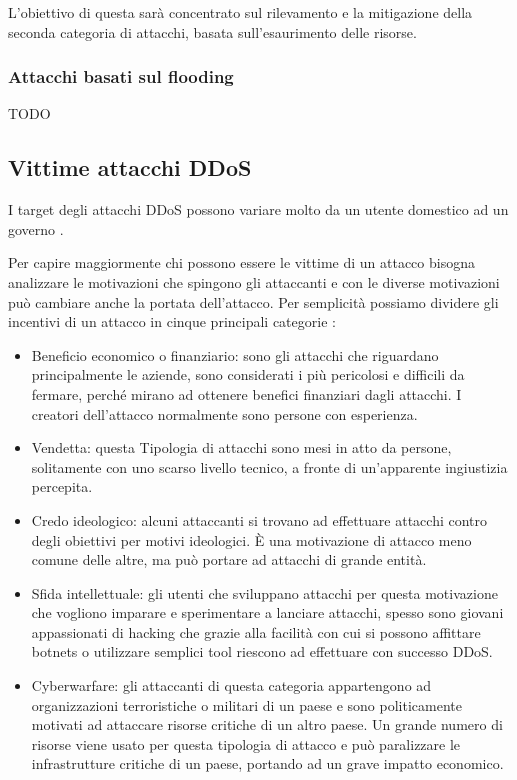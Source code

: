 L'obiettivo di questa sarà concentrato sul rilevamento e la mitigazione della seconda categoria di attacchi, basata sull'esaurimento delle risorse.

\subsubsection{Attacchi basati sul flooding}

TODO

\subsection{Vittime attacchi DDoS}

I target degli attacchi DDoS possono variare molto da un utente domestico ad un governo \cite{ddos_motivations}.


Per capire maggiormente chi possono essere le vittime di un attacco bisogna analizzare le motivazioni che spingono gli attaccanti e con le diverse motivazioni può cambiare anche la portata dell'attacco. Per semplicità possiamo dividere gli incentivi di un attacco in cinque principali categorie \cite{ddos_survey_1}\cite{ddos_motivations}:

\begin{itemize}
    \item Beneficio economico o finanziario: sono gli attacchi che riguardano principalmente le aziende, sono considerati i più pericolosi e difficili da fermare, perché mirano ad ottenere benefici finanziari dagli attacchi. I creatori dell'attacco normalmente sono persone con esperienza.
    \item Vendetta: questa Tipologia di attacchi sono mesi in atto da persone, solitamente con uno scarso livello tecnico, a fronte di un'apparente ingiustizia percepita.
    \item Credo ideologico: alcuni attaccanti si trovano ad effettuare attacchi contro degli obiettivi per motivi ideologici. È una motivazione di attacco meno comune delle altre, ma può portare ad attacchi di grande entità. %
    \item Sfida intellettuale: gli utenti che sviluppano attacchi per questa motivazione che vogliono imparare e sperimentare a lanciare attacchi, spesso sono giovani appassionati di hacking che grazie alla facilità con cui si possono affittare botnets o utilizzare semplici tool riescono ad effettuare con successo DDoS.
    \item Cyberwarfare: gli attaccanti di questa categoria appartengono ad organizzazioni terroristiche o militari di un paese e sono politicamente motivati ad attaccare risorse critiche di un altro paese. Un grande numero di risorse viene usato per questa tipologia di attacco e può paralizzare le infrastrutture critiche di un paese, portando ad un grave impatto economico.
\end{itemize}


